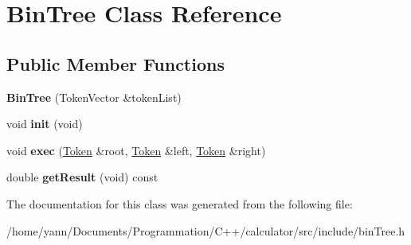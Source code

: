 \hypertarget{class_bin_tree}{\section{Bin\-Tree Class Reference}
\label{class_bin_tree}
}
\subsection*{Public Member Functions}
\begin{DoxyCompactItemize}
\item 
\hypertarget{class_bin_tree_acccd45fd06fa6629d4f0b78246b06f63}{{\bfseries Bin\-Tree} (Token\-Vector \&token\-List)}\label{class_bin_tree_acccd45fd06fa6629d4f0b78246b06f63}

\item 
\hypertarget{class_bin_tree_ac573447f4f0f056b29d36f4b585034d6}{void {\bfseries init} (void)}\label{class_bin_tree_ac573447f4f0f056b29d36f4b585034d6}

\item 
\hypertarget{class_bin_tree_aabd8fc4955f4a2d87ac33ca2fb8d3315}{void {\bfseries exec} (\hyperlink{class_token}{Token} \&root, \hyperlink{class_token}{Token} \&left, \hyperlink{class_token}{Token} \&right)}\label{class_bin_tree_aabd8fc4955f4a2d87ac33ca2fb8d3315}

\item 
\hypertarget{class_bin_tree_a85c7135e307c8f847e3572e4b9612615}{double {\bfseries get\-Result} (void) const }\label{class_bin_tree_a85c7135e307c8f847e3572e4b9612615}

\end{DoxyCompactItemize}


The documentation for this class was generated from the following file\-:\begin{DoxyCompactItemize}
\item 
/home/yann/\-Documents/\-Programmation/\-C++/calculator/src/include/bin\-Tree.\-h\end{DoxyCompactItemize}
